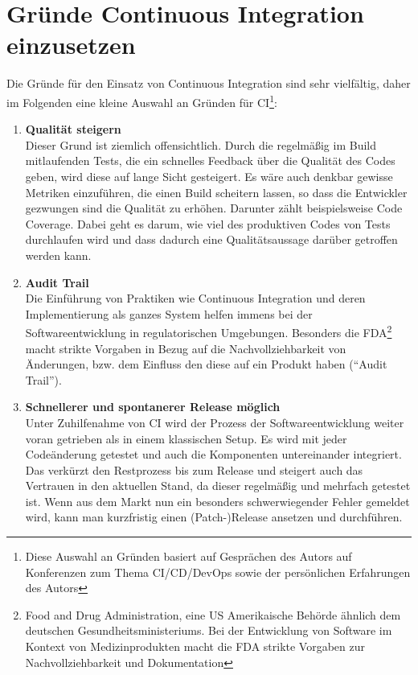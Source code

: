 \section{Gründe Continuous Integration einzusetzen}\label{sec:Gründe Continuous Integration einzusetzen}
Die Gründe für den Einsatz von Continuous Integration sind sehr vielfältig, daher im Folgenden eine kleine Auswahl an Gründen für CI\footnote{Diese Auswahl an Gründen basiert auf Gesprächen des Autors auf Konferenzen zum Thema CI/CD/DevOps sowie der persönlichen Erfahrungen des Autors}:
\begin{enumerate}
	\item \textbf{Qualität steigern}\\
	Dieser Grund ist ziemlich offensichtlich. Durch die regelmäßig im Build mitlaufenden Tests, die ein schnelles Feedback über die Qualität des Codes geben, wird diese auf lange Sicht gesteigert. Es wäre auch denkbar gewisse Metriken einzuführen, die einen Build scheitern lassen, so dass die Entwickler gezwungen sind die Qualität zu erhöhen. Darunter zählt beispielsweise Code Coverage. Dabei geht es darum, wie viel des produktiven Codes von Tests durchlaufen wird und dass dadurch eine Qualitätsaussage darüber getroffen werden kann.	
	\item \textbf{Audit Trail}\\
	Die Einführung von Praktiken wie Continuous Integration und deren Implementierung als ganzes System helfen immens bei der Softwareentwicklung in regulatorischen Umgebungen. Besonders die FDA\footnote{Food and Drug Administration, eine US Amerikaische Behörde ähnlich dem deutschen Gesundheitsministeriums. Bei der Entwicklung von Software im Kontext von Medizinprodukten macht die FDA strikte Vorgaben zur Nachvollziehbarkeit und Dokumentation} macht strikte Vorgaben in Bezug auf die Nachvollziehbarkeit von Änderungen, bzw. dem Einfluss den diese auf ein Produkt haben ("`Audit Trail"').
	\item \textbf{Schnellerer und spontanerer Release möglich}\\
	Unter Zuhilfenahme von CI wird der Prozess der Softwareentwicklung weiter voran getrieben als in einem klassischen Setup. Es wird mit jeder Codeänderung getestet und auch die Komponenten untereinander integriert. Das verkürzt den Restprozess bis zum Release und steigert auch das Vertrauen in den aktuellen Stand, da dieser regelmäßig und mehrfach getestet ist. Wenn aus dem Markt nun ein besonders schwerwiegender Fehler gemeldet wird, kann man kurzfristig einen (Patch-)Release ansetzen und durchführen.

\end{enumerate}
